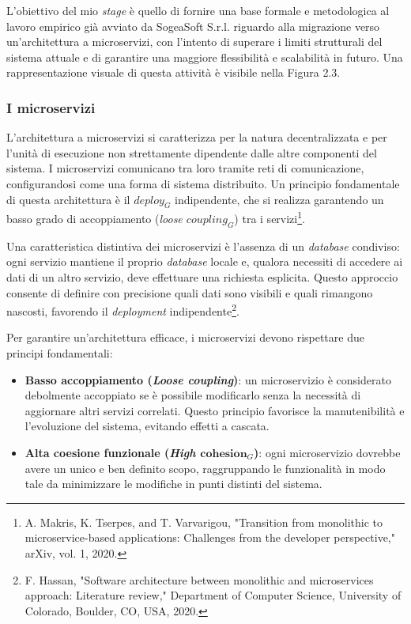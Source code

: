            \vspace{0.2 em}
            \noindent L'obiettivo del mio \textit{stage} è quello di fornire una base formale e metodologica al lavoro empirico già avviato da SogeaSoft S.r.l. riguardo alla migrazione verso un'architettura a microservizi, con l’intento di superare i limiti strutturali del sistema attuale e di garantire una maggiore flessibilità e scalabilità in futuro. Una rappresentazione visuale di questa attività è visibile nella Figura 2.3.

            \subsubsection{I microservizi}
        
            L'architettura a microservizi si caratterizza per la natura decentralizzata e per l’unità di esecuzione non strettamente dipendente dalle altre componenti del sistema. I microservizi comunicano tra loro tramite reti di comunicazione, configurandosi come una forma di sistema distribuito. Un principio fondamentale di questa architettura è il \textit{$deploy_G$} indipendente, che si realizza garantendo un basso grado di accoppiamento (\textit{loose $coupling_G$}) tra i servizi\footnote{A. Makris, K. Tserpes, and T. Varvarigou, "Transition from monolithic to microservice-based applications: Challenges from the developer perspective," arXiv, vol. 1, 2020.}.  

            \vspace{0.2 em}
            \noindent Una caratteristica distintiva dei microservizi è l’assenza di un \textit{database} condiviso: ogni servizio mantiene il proprio \textit{database} locale e, qualora necessiti di accedere ai dati di un altro servizio, deve effettuare una richiesta esplicita. Questo approccio consente di definire con precisione quali dati sono visibili e quali rimangono nascosti, favorendo il \textit{deployment} indipendente\footnote{F. Hassan, "Software architecture between monolithic and microservices approach: Literature review," Department of Computer Science, University of Colorado, Boulder, CO, USA, 2020.}.  

            \vspace{0.2 em}
            \noindent Per garantire un’architettura efficace, i microservizi devono rispettare due principi fondamentali:  
            \begin{itemize}
                \item \textbf{Basso accoppiamento (\textit{Loose coupling})}: un microservizio è considerato debolmente accoppiato se è possibile modificarlo senza la necessità di aggiornare altri servizi correlati. Questo principio favorisce la manutenibilità e l'evoluzione del sistema, evitando effetti a cascata.
                \item \textbf{Alta coesione funzionale (\textit{High $\textbf{cohesion}_G$})}: ogni microservizio dovrebbe avere un unico e ben definito scopo, raggruppando le funzionalità in modo tale da minimizzare le modifiche in punti distinti del sistema. 
            \end{itemize} 

